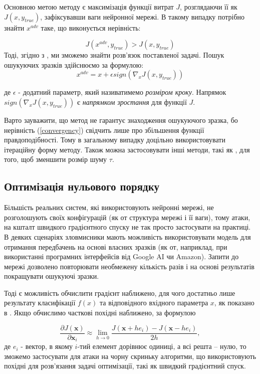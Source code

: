 \documentclass[14pt,a4paper]{extarticle}
\newcounter{e}
\numberwithin{equation}{section}
\numberwithin{figure}{section}
\begin{document}
 Основною метою методу є максимізація функції витрат $J$, розглядаючи її як $J(x, y_{true})$, зафіксувавши ваги нейронної мережі. В такому випадку потрібно знайти $x^{adv}$ таке, що виконується нерівність: 

 \begin{equation}
 J\left(x^{adv}, y_{true}\right)>J\left(x, y_{true}\right)
 \label{convergency}
 \end{equation}
 Тоді, згідно з \cite{quarteroni}, ми зможемо знайти розв'язок поставленої задачі. Пошук ошукуючих зразків здійснюємо за формулою:
 \begin{equation}
 x^{adv} = x + \epsilon {sign}\left(\nabla_x J\left(x, y_{true}\right)\right)
 \label{FGSM}
 \end{equation}
 
 де $\epsilon$ - додатний параметр, який називатимемо \textit{розміром кроку}. Напрямок ${sign}\left(\nabla_x J\left(x, y_{true}\right)\right)$ є \textit{напрямком зростання} для функції $J$.

 Варто зауважити, що метод не гарантує знаходження ошукуючого зразка, бо нерівність (\ref{convergency}) свідчить лише про збільшення функції правдоподібності. Тому в загальному випадку доцільно використовувати ітераційну форму методу. Також можна застосовувати інші методи, такі як \cite{C-and-W}, для того, щоб зменшити розмір шуму $\tau$.


 \subsection{Оптимізація нульового порядку}
 Більшість реальних систем, які використовують нейронні мережі, не розголошують своїх конфігурацій (як от структура мережі і її ваги), тому атаки, на кшталт швидкого градієнтного спуску не так просто застосувати на практиці. В деяких сценаріях зловмисники мають можливість використовувати модель для отримання передбачень на основі власних зразків (як от, наприклад, при використанні  програмних інтерфейсів від Google AI чи Amazon). Запити до мережі  дозволено повторювати необмежену кількість разів і на основі результатів покращувати ошукуючі зразки.

 Тоді є можливість обчислити градієнт наближено, для чого достатньо лише результату класифікації $f(x)$ та відповідного вхідного параметра $x$, як показано в \cite{zoo}. Якщо обчислимо часткові похідні наближено, за формулою

 \begin{equation}
 \frac{\partial J(\mathbf{x})}{\partial \mathbf{x}_{i}} \approx
 \lim_{h \to 0} \frac{J\left(\mathbf{x}+h e_{i}\right)-J\left(\mathbf{x}-h e_{i}\right)}{2h},
 \label{df-zoo}
 \end{equation}
 де $e_i$ - вектор, в якому $i$-тий елемент дорівнює одиниці, а всі решта -- нулю, то зможемо застосувати для атаки на чорну скриньку алгоритми, що використовують похідні для розв'язання задачі оптимізації, такі як швидкий градієнтний спуск.
\end{document}
